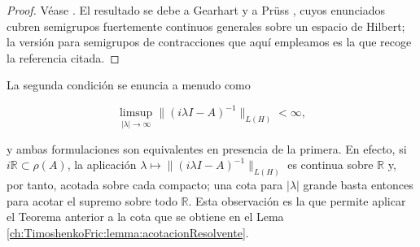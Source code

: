 \begin{proof}
    Véase \cite[Teorema~1.3.2]{liu-1999-sem-ass-dis}. El resultado se debe a Gearhart \cite{gearhart-1978-spe-the-con} y a Prüss \cite{pruss-1984-spe-c-0}, cuyos enunciados cubren semigrupos fuertemente continuos generales sobre un espacio de Hilbert; la versión para semigrupos de contracciones que aquí empleamos es la que recoge la referencia citada.
\end{proof}

\begin{Observacion}
    \label{ch:semigrupos:section:estExp:obs:supVsLimite}

    La segunda condición se enuncia a menudo como

    \[\limsup_{\lvert \lambda \rvert \rightarrow \infty}\lVert (i\lambda I - A)^{-1}\rVert_{L(H)} < \infty,\]

    y ambas formulaciones son equivalentes en presencia de la primera. En efecto, si $i\mathbb{R} \subset \rho(A)$, la aplicación $\lambda \mapsto \lVert (i\lambda I - A)^{-1}\rVert_{L(H)}$ es continua sobre $\mathbb{R}$ y, por tanto, acotada sobre cada compacto; una cota para $\lvert \lambda \rvert$ grande basta entonces para acotar el supremo sobre todo $\mathbb{R}$. Esta observación es la que permite aplicar el Teorema anterior a la cota que se obtiene en el Lema \ref{ch:TimoshenkoFric:lemma:acotacionResolvente}.
\end{Observacion}